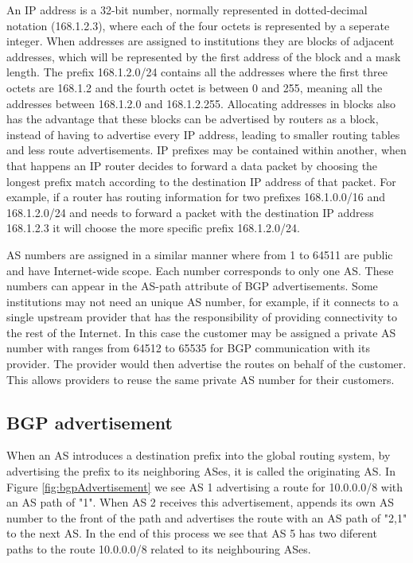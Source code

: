 \documentclass[11pt,a4paper]{scrreprt}
\begin{document}
	An IP address is a 32-bit number, normally represented in dotted-decimal notation (168.1.2.3), where each of the four octets is represented by a seperate integer. When addresses are assigned to institutions they are blocks of adjacent addresses, which will be represented by the first address of the block and a mask length. The prefix 168.1.2.0/24 contains all the addresses where the first three octets are 168.1.2 and the fourth octet is between 0 and 255, meaning all the addresses between 168.1.2.0 and 168.1.2.255. Allocating addresses in blocks also has the advantage that these blocks can be advertised by routers as a block, instead of having to advertise every IP address, leading to smaller routing tables and less route advertisements. IP prefixes may be contained within another, when that happens an IP router decides to forward a data packet by choosing the longest prefix match according to the destination IP address of that packet. For example, if a router has routing information for two prefixes 168.1.0.0/16 and 168.1.2.0/24 and needs to forward a packet with the destination IP address 168.1.2.3 it will choose the more specific prefix 168.1.2.0/24. 

AS numbers are assigned in a similar manner where from 1 to 64511 are public and have Internet-wide scope. Each number corresponds to only one AS. These numbers can appear in the AS-path attribute of BGP advertisements. Some institutions may not need an unique AS number, for example, if it connects to a single upstream provider that has the responsibility of providing connectivity to the rest of the Internet. In this case the customer may be assigned a private AS number with ranges from 64512 to 65535 for BGP communication with its provider. The provider would then advertise the routes on behalf of the customer. This allows providers to reuse the same private AS number for their customers.

\subsection{BGP advertisement}

When an AS introduces a destination prefix into the global routing system, by advertising the prefix to its neighboring ASes, it is called the originating AS. In Figure \ref{fig:bgpAdvertisement} we see AS 1 advertising a route for 10.0.0.0/8 with an AS path of "1". When AS 2 receives this advertisement, appends its own AS number to the front of the path and advertises the route with an AS path of "2,1" to the next AS. In the end of this process we see that AS 5 has two diferent paths to the route 10.0.0.0/8 related to its neighbouring ASes.
\end{document}
